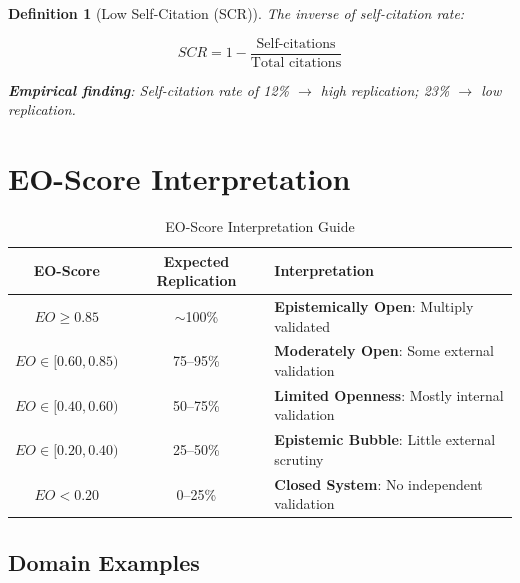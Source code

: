 \documentclass[11pt,a4paper]{article}
\newtheorem{definition}{Definition}[section]
\begin{document}
\begin{definition}[Low Self-Citation (SCR)]
\label{def:scr}
The inverse of self-citation rate:

\begin{equation}
SCR = 1 - \frac{\text{Self-citations}}{\text{Total citations}}
\end{equation}

\textbf{Empirical finding}: Self-citation rate of 12\% $\rightarrow$ high replication; 23\% $\rightarrow$ low replication.
\end{definition}


\section{EO-Score Interpretation}
\label{sec:interpretation}

\begin{table}[h]
\centering
\caption{EO-Score Interpretation Guide}
\label{tab:interpretation}
\begin{tabular}{ccp{6cm}}
\toprule
\textbf{EO-Score} & \textbf{Expected Replication} & \textbf{Interpretation} \\
\midrule
$EO \geq 0.85$ & $\sim$100\% & \textcolor{eslgreen}{\textbf{Epistemically Open}}: Multiply validated \\
$EO \in [0.60, 0.85)$ & 75--95\% & \textcolor{eslblue}{\textbf{Moderately Open}}: Some external validation \\
$EO \in [0.40, 0.60)$ & 50--75\% & \textcolor{eslorange}{\textbf{Limited Openness}}: Mostly internal validation \\
$EO \in [0.20, 0.40)$ & 25--50\% & \textcolor{eslred}{\textbf{Epistemic Bubble}}: Little external scrutiny \\
$EO < 0.20$ & 0--25\% & \textcolor{dangerzone}{\textbf{Closed System}}: No independent validation \\
\bottomrule
\end{tabular}
\end{table}

\subsection{Domain Examples}
\end{document}
